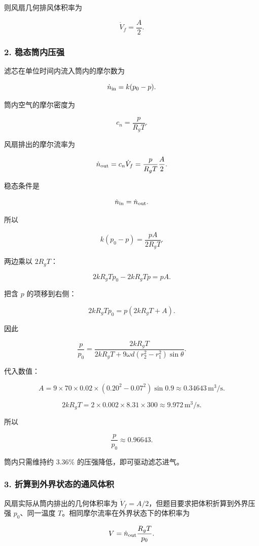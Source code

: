 \documentclass[12pt,a4paper,UTF8]{ctexart}
\begin{document}
则风扇几何排风体积率为

\[
\boxed{\dot V_f=\frac{A}{2}}.
\]

\subsubsection{2.
稳态筒内压强}\label{ux7a33ux6001ux7b52ux5185ux538bux5f3a}

滤芯在单位时间内流入筒内的摩尔数为

\[
\dot n_{\rm in}=k(p_0-p).
\]

筒内空气的摩尔密度为

\[
c_n=\frac{p}{R_gT}.
\]

风扇排出的摩尔流率为

\[
\dot n_{\rm out}=c_n\dot V_f
=\frac{p}{R_gT}\frac{A}{2}.
\]

稳态条件是

\[
\dot n_{\rm in}=\dot n_{\rm out}.
\]

所以

\[
k(p_0-p)=\frac{pA}{2R_gT}.
\]

两边乘以 \(2R_gT\)：

\[
2kR_gTp_0-2kR_gTp=pA.
\]

把含 \(p\) 的项移到右侧：

\[
2kR_gTp_0=p(2kR_gT+A).
\]

因此

\[
\boxed{
\frac{p}{p_0}
=\frac{2kR_gT}
{2kR_gT+9\omega d(r_2^2-r_1^2)\sin\theta}
}.
\]

代入数值：

\[
A=9\times70\times0.02\times(0.20^2-0.07^2)\sin0.9
\approx0.34643\,\mathrm{m^3/s}.
\]

\[
2kR_gT=2\times0.002\times8.31\times300
\approx9.972\,\mathrm{m^3/s}.
\]

所以

\[
\boxed{\frac{p}{p_0}\approx0.96643}.
\]

筒内只需维持约 \(3.36\%\) 的压强降低，即可驱动滤芯进气。

\subsubsection{3.
折算到外界状态的通风体积}\label{ux6298ux7b97ux5230ux5916ux754cux72b6ux6001ux7684ux901aux98ceux4f53ux79ef}

风扇实际从筒内排出的几何体积率为
\(\dot V_f=A/2\)，但题目要求把体积折算到外界压强 \(p_0\)、同一温度
\(T\)。相同摩尔流率在外界状态下的体积率为

\[
V=\dot n_{\rm out}\frac{R_gT}{p_0}.
\]
\end{document}
